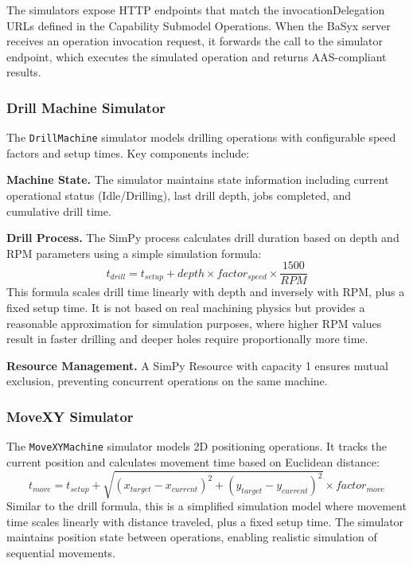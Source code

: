 The simulators expose HTTP endpoints that match the invocationDelegation URLs defined in the Capability Submodel Operations. When the BaSyx server receives an operation invocation request, it forwards the call to the simulator endpoint, which executes the simulated operation and returns \ac{AAS}-compliant results.
\subsubsection{Drill Machine Simulator}

The \texttt{DrillMachine} simulator models drilling operations with configurable speed factors and setup times. Key components include:

\textbf{Machine State.} The simulator maintains state information including current operational status (Idle/Drilling), last drill depth, jobs completed, and cumulative drill time.

\textbf{Drill Process.} The SimPy process calculates drill duration based on depth and RPM parameters using a simple simulation formula:
\begin{equation}
t_{drill} = t_{setup} + depth \times factor_{speed} \times \frac{1500}{RPM}
\end{equation}
This formula scales drill time linearly with depth and inversely with RPM, plus a fixed setup time. It is not based on real machining physics but provides a reasonable approximation for simulation purposes, where higher RPM values result in faster drilling and deeper holes require proportionally more time.

\textbf{Resource Management.} A SimPy Resource with capacity 1 ensures mutual exclusion, preventing concurrent operations on the same machine.

\subsubsection{MoveXY Simulator}

The \texttt{MoveXYMachine} simulator models 2D positioning operations. It tracks the current position and calculates movement time based on Euclidean distance:
\begin{equation}
t_{move} = t_{setup} + \sqrt{(x_{target} - x_{current})^2 + (y_{target} - y_{current})^2} \times factor_{move}
\end{equation}
Similar to the drill formula, this is a simplified simulation model where movement time scales linearly with distance traveled, plus a fixed setup time. The simulator maintains position state between operations, enabling realistic simulation of sequential movements.

